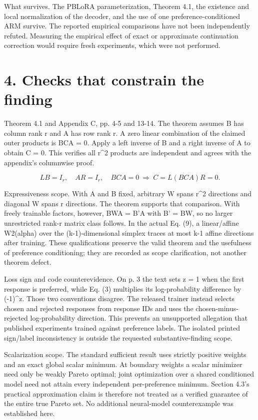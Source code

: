 \documentclass[10pt]{article}
\begin{document}
What survives. The PBLoRA parameterization, Theorem 4.1, the existence and local normalization of the decoder, and the use of one preference-conditioned ARM survive. The reported empirical comparisons have not been independently refuted. Measuring the empirical effect of exact or approximate continuation correction would require fresh experiments, which were not performed.\par
\section*{4. Checks that constrain the finding}
Theorem 4.1 and Appendix C, pp. 4-5 and 13-14. The theorem assumes B has column rank r and A has row rank r. A zero linear combination of the claimed outer products is BCA = 0. Apply a left inverse of B and a right inverse of A to obtain C = 0. This verifies all r\textasciicircum{}2 products are independent and agrees with the appendix’s columnwise proof.\par
\[L B=I_r,\quad A R=I_r,\quad BCA=0\ \Longrightarrow\ C=L(BCA)R=0.\]\par
Expressiveness scope. With A and B fixed, arbitrary W spans r\textasciicircum{}2 directions and diagonal W spans r directions. The theorem supports that comparison. With freely trainable factors, however, BWA = B’A with B’ = BW, so no larger unrestricted rank-r matrix class follows. In the actual Eq. (9), a linear/affine W2(alpha) over the (k-1)-dimensional simplex traces at most k-1 affine directions after training. These qualifications preserve the valid theorem and the usefulness of preference conditioning; they are recorded as scope clarification, not another theorem defect.\par
Loss sign and code counterevidence. On p. 3 the text sets z = 1 when the first response is preferred, while Eq. (3) multiplies its log-probability difference by (-1)\textasciicircum{}z. Those two conventions disagree. The released trainer instead selects chosen and rejected responses from response IDs and uses the chosen-minus-rejected log-probability direction. This prevents an unsupported allegation that published experiments trained against preference labels. The isolated printed sign/label inconsistency is outside the requested substantive-finding scope.\par
Scalarization scope. The standard sufficient result uses strictly positive weights and an exact global scalar minimum. At boundary weights a scalar minimizer need only be weakly Pareto optimal; joint optimization over a shared conditioned model need not attain every independent per-preference minimum. Section 4.3’s practical approximation claim is therefore not treated as a verified guarantee of the entire true Pareto set. No additional neural-model counterexample was established here.\par
\end{document}

